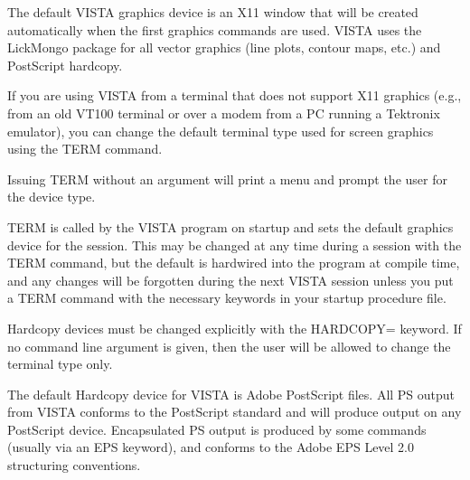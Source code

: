 The default VISTA graphics device is an X11 window that will be created
automatically when the first graphics commands are used.  VISTA uses the
LickMongo package for all vector graphics (line plots, contour maps, etc.)
and PostScript hardcopy.

If you are using VISTA from a terminal that does not support X11 graphics
(e.g., from an old VT100 terminal or over a modem from a PC running a
Tektronix emulator), you can change the default terminal type used
for screen graphics using the TERM command.

Issuing TERM without an argument will print a menu and prompt the
user for the device type.

TERM is called by the VISTA program on startup and sets the default
graphics device for the session.  This may be changed at any time
during a session with the TERM command, but the default is hardwired
into the program at compile time, and any changes will be forgotten
during the next VISTA session unless you put a TERM command with
the necessary keywords in your startup procedure file.

Hardcopy devices must be changed explicitly with the HARDCOPY= keyword.  If
no command line argument is given, then the user will be allowed to change
the terminal type only.

The default Hardcopy device for VISTA is Adobe PostScript files.  All PS
output from VISTA conforms to the PostScript standard and will produce
output on any PostScript device.  Encapsulated PS output is produced by
some commands (usually via an EPS keyword), and conforms to the Adobe EPS
Level 2.0 structuring conventions.

